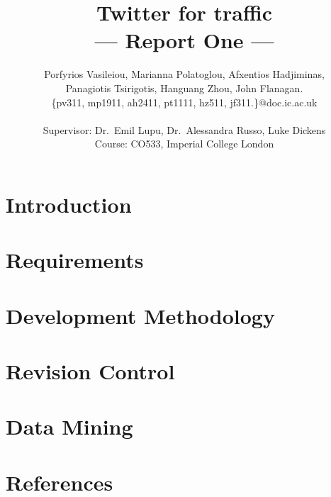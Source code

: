 \documentclass[a4paper,11pt]{article}
\title{Twitter for traffic\\\Large{--- Report One ---}}
\author{Porfyrios Vasileiou, Marianna Polatoglou, Afxentios Hadjiminas,\\
        Panagiotis Tsirigotis, Hanguang Zhou, John Flanagan.\\
       \{pv311, mp1911, ah2411, pt1111, hz511, jf311.\}@doc.ic.ac.uk\\ \\
       \small{Supervisor: Dr.\ Emil Lupu, Dr.\ Alessandra Russo, Luke Dickens}\\
       \small{Course: CO533, Imperial College London}
}
\begin{document}
\maketitle

\section{Introduction}
	

\section{Requirements}
	

\section{Development Methodology}
	

\section{Revision Control}
	

\section{Data Mining}
	

\pagebreak	
\section{References}
	\vspace{-20pt}
	\def\refname{}
	
	
\end{document}
